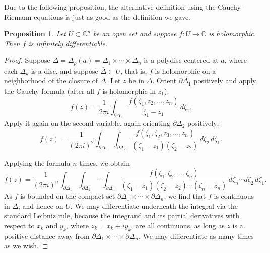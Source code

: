 \documentclass[12pt,openany]{book}
\newcommand{\C}{{\mathbb{C}}}
\theoremstyle{plain}
\newtheorem{prop}[thm]{Proposition}
\theoremstyle{remark}
\theoremstyle{definition}
\theoremstyle{exercise}
\theoremstyle{example}
\begin{document}
Due to the following proposition, the alternative definition using the
Cauchy--Riemann equations is just as good as the definition we gave.

\begin{prop}
Let $U \subset \C^n$ be an open set and
suppose $f \colon U \to \C$ is holomorphic.  Then $f$ is infinitely
differentiable.
\end{prop}

\begin{proof}
Suppose $\Delta = \Delta_{\rho}(a) = \Delta_1 \times \cdots \times \Delta_n$
is a polydisc centered at $a$, where each $\Delta_k$ is a disc,
and suppose $\overline{\Delta} \subset U$, that is, $f$ is holomorphic
on a neighborhood of the closure of $\Delta$.
Let $z$ be in $\Delta$.
Orient $\partial \Delta_1$ positively and
apply the Cauchy formula (after all $f$ is holomorphic in $z_1$):
\begin{equation*}
f(z) =
\frac{1}{2\pi i}
\int_{\partial \Delta_1}
\frac{f(\zeta_1,z_2,\ldots,z_n)}{\zeta_1-z_1}
\,
d \zeta_1 .
\end{equation*}
Apply it again on the second variable, again orienting
$\partial \Delta_2$ positively:
\begin{equation*}
f(z) =
\frac{1}{{(2\pi i)}^2}
\int_{\partial \Delta_1}
\int_{\partial \Delta_2}
\frac{f(\zeta_1,\zeta_2,z_3,\ldots,z_n)}{(\zeta_1-z_1)(\zeta_2-z_2)}
\,
d \zeta_2
\,
d \zeta_1 .
\end{equation*}

Applying the formula $n$ times, we obtain
\begin{equation} \label{iteratedcauchy:eq}
f(z) =
\frac{1}{{(2\pi i)}^n}
\int_{\partial \Delta_1}
\int_{\partial \Delta_2}
\cdots
\int_{\partial \Delta_n}
\frac{f(\zeta_1,\zeta_2,\ldots,\zeta_n)}{(\zeta_1-z_1)(\zeta_2-z_2)\cdots(\zeta_n-z_n)}
\,
d \zeta_n
\cdots
d \zeta_2
\,
d \zeta_1 .
\end{equation}
As $f$ is bounded on the compact set
$\partial \Delta_1 \times \cdots \times \partial \Delta_n$,
we find that $f$ is continuous in $\Delta$, and hence on $U$.
We may differentiate underneath the
integral via the standard Leibniz rule,
because the integrand and its partial derivatives
with respect to $x_k$ and $y_k$, where $z_k=x_k+i y_k$, are
all continuous, as long as $z$
is a positive distance away from
$\partial \Delta_1 \times \cdots \times \partial \Delta_n$.
We may differentiate as many times as we wish.
\end{proof}
\end{document}
